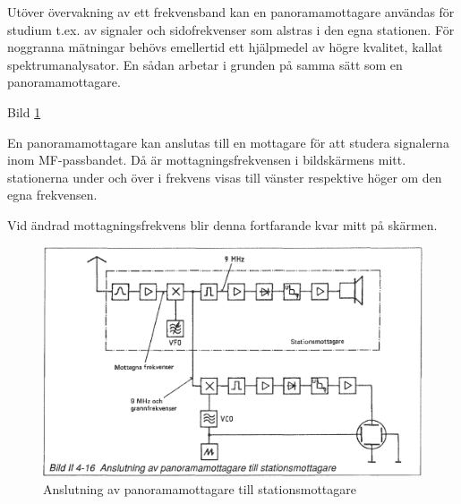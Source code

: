 Utöver övervakning av ett frekvensband kan en panoramamottagare
användas för studium t.ex. av signaler och sidofrekvenser som alstras
i den egna stationen. För noggranna mätningar behövs emellertid ett
hjälpmedel av högre kvalitet, kallat spektrumanalysator. En sådan
arbetar i grunden på samma sätt som en panoramamottagare.

Bild \ref{fig:bildII4-16}

En panoramamottagare kan anslutas till en mottagare för att studera
signalerna inom MF-passbandet. Då är mottagningsfrekvensen i
bildskärmens mitt. stationerna under och över i frekvens visas till
vänster respektive höger om den egna frekvensen.

Vid ändrad mottagningsfrekvens blir denna fortfarande kvar mitt på
skärmen.

\begin{figure}
  \includegraphics[width=\textwidth]{images/bild_2_4-16}
  \caption{Anslutning av panoramamottagare till stationsmottagare}
  \label{fig:bildII4-16}
\end{figure}
